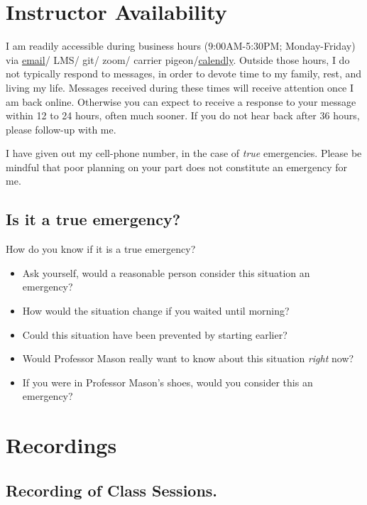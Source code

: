 \documentclass[
]{book}
\providecommand{\tightlist}{%
  \setlength{\itemsep}{0pt}\setlength{\parskip}{0pt}}
\begin{document}
\section{Instructor Availability}\label{instructor-availability}

I am readily accessible during business hours (9:00AM-5:30PM; Monday-Friday) via \href{garrissm@wfu.edu}{email}/ LMS/ git/ zoom/ carrier pigeon/\href{https://calendly.com/smasongarrison/}{calendly}. Outside those hours, I do not typically respond to messages, in order to devote time to my family, rest, and living my life. Messages received during these times will receive attention once I am back online. Otherwise you can expect to receive a response to your message within 12 to 24 hours, often much sooner. If you do not hear back after 36 hours, please follow-up with me.

I have given out my cell-phone number, in the case of \emph{true} emergencies. Please be mindful that poor planning on your part does not constitute an emergency for me.

\subsection{Is it a true emergency?}\label{is-it-a-true-emergency}

How do you know if it is a true emergency?

\begin{itemize}
\tightlist
\item
  Ask yourself, would a reasonable person consider this situation an emergency?
\item
  How would the situation change if you waited until morning?
\item
  Could this situation have been prevented by starting earlier?
\item
  Would Professor Mason really want to know about this situation \emph{right} now?
\item
  If you were in Professor Mason's shoes, would you consider this an emergency?
\end{itemize}

\section{Recordings}\label{recordings}

\subsection{Recording of Class Sessions.}\label{recording-of-class-sessions.}
\end{document}

